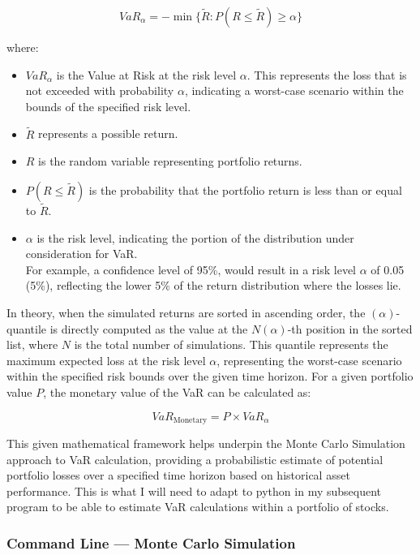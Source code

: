 \documentclass{article}
\begin{document}
\begin{equation}
  VaR_\alpha = -\min \{\tilde{R} : P(R \leq \tilde{R}) \geq \alpha\}
\end{equation}

where:
\begin{itemize}
  \item \(VaR_\alpha\) is the Value at Risk at the risk level \(\alpha\). This represents the loss that is not exceeded with probability \(\alpha\), indicating a worst-case scenario within the bounds of the specified risk level.
  \item \(\tilde{R}\) represents a possible return.
  \item \(R\) is the random variable representing portfolio returns.
  \item \(P(R \leq \tilde{R})\) is the probability that the portfolio return is less than or equal to \(\tilde{R}\).
  \item \(\alpha\) is the risk level, indicating the portion of the distribution under consideration for VaR. \\For example, a confidence level of 95\%, would result in a risk level \(\alpha\) of 0.05 (5\%), reflecting the lower 5\% of the return distribution where the losses lie.
\end{itemize}

In theory, when the simulated returns are sorted in ascending order, the \((\alpha)\)-quantile is directly computed as the value at the \(N(\alpha)\)-th position in the sorted list, where \(N\) is the total number of simulations. This quantile represents the maximum expected loss at the risk level \(\alpha\), representing the worst-case scenario within the specified risk bounds over the given time horizon. For a given portfolio value \(P\), the monetary value of the VaR can be calculated as:

\begin{equation}
    VaR_{\text{Monetary}} = P \times VaR_\alpha
\end{equation}

This given mathematical framework helps underpin the Monte Carlo Simulation approach to VaR calculation, providing a probabilistic estimate of potential portfolio losses over a specified time horizon based on historical asset performance. This is what I will need to adapt to python in my subsequent program to be able to estimate VaR calculations within a portfolio of stocks.



\subsubsection{Command Line --- Monte Carlo Simulation}
\end{document}
